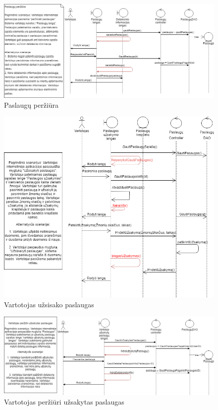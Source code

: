 \documentclass[oneside]{VUMIFPSkursinis}
\begin{document}
			\begin{figure}[h]
    				\centering
    				\includegraphics[width=1\textwidth]{seq4.png}
    				\caption{Paslaugų peržiūra}
    				\label{fig:Paslaugų peržiūra}
			\end{figure}

			\begin{figure}[h]
    				\centering
    				\includegraphics[width=1\textwidth]{seq6.png}
    				\caption{Vartotojas užsisako paslaugas}
    				\label{fig:Vartotojas užsisako paslaugas}
			\end{figure}

			\begin{figure}[h]
    				\centering
    				\includegraphics[width=1\textwidth]{seq7.png}
    				\caption{Vartotojas peržiūri užsakytas paslaugas}
    				\label{fig:Vartotojas peržiūri užsakytas paslaugas}
			\end{figure}
\end{document}
